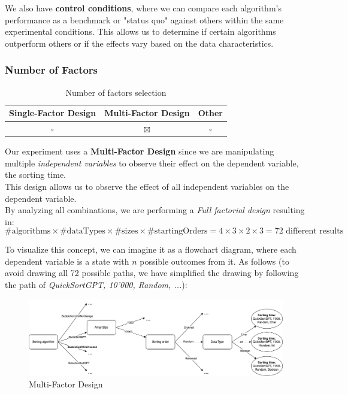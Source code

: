 \documentclass{article}
\begin{document}
We also have \textbf{control conditions}, where we can compare each algorithm's performance as a benchmark or "status quo" against others within the same experimental conditions. This allows us to determine if certain algorithms outperform others or if the effects vary based on the data characteristics.

\subsubsection{Number of Factors}
\begin{table}[!h]
    \centering
    \begin{tabular}{c|c|c}
        \textbf{Single-Factor Design} & \textbf{Multi-Factor Design} & \textbf{Other} \\ \hline
        \(\square\)                   & \(\boxtimes\)                & \(\square\)    \\
    \end{tabular}
    \caption{Number of factors selection}
\end{table}

Our experiment uses a \textbf{Multi-Factor Design} since we are manipulating multiple \textit{independent variables} to observe their effect on the dependent variable, the sorting time. \\
This design allows us to observe the effect of all independent variables on the dependent variable. \\
By analyzing all combinations, we are performing a \textit{Full factorial design} resulting in:
\[
    \#\text{algorithms} \times \#\text{dataTypes} \times \#\text{sizes} \times \#\text{startingOrders} = 4 \times 3 \times 2 \times 3 = 72 \text{ different results}
\]

To visualize this concept, we can imagine it as a flowchart diagram, where each dependent variable is a state with \( n \) possible outcomes from it. As follows (to avoid drawing all 72 possible paths, we have simplified the drawing by following the path of \textit{QuickSortGPT, 10'000, Random, ...}):

\begin{figure}[!h]
    \centering
    \includegraphics[width=1\linewidth]{MultiFactorDesign.png}
    \caption{Multi-Factor Design}
    \label{fig:multifactorDesign}
\end{figure}
\end{document}
